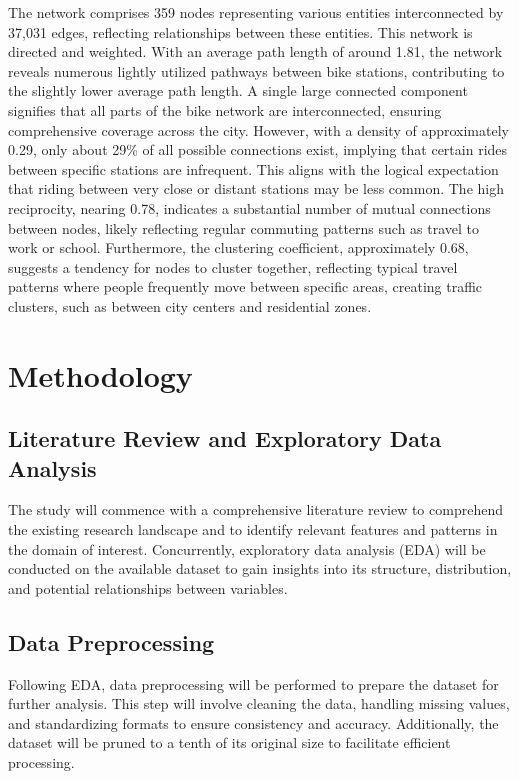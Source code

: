 \documentclass[conference]{IEEEtran}
\begin{document}
The network comprises 359 nodes representing various entities interconnected by 37,031 edges, reflecting relationships between these entities. This network is directed and weighted. With an average path length of around 1.81, the network reveals numerous lightly utilized pathways between bike stations, contributing to the slightly lower average path length. A single large connected component signifies that all parts of the bike network are interconnected, ensuring comprehensive coverage across the city. However, with a density of approximately 0.29, only about 29\% of all possible connections exist, implying that certain rides between specific stations are infrequent. This aligns with the logical expectation that riding between very close or distant stations may be less common. The high reciprocity, nearing 0.78, indicates a substantial number of mutual connections between nodes, likely reflecting regular commuting patterns such as travel to work or school. Furthermore, the clustering coefficient, approximately 0.68, suggests a tendency for nodes to cluster together, reflecting typical travel patterns where people frequently move between specific areas, creating traffic clusters, such as between city centers and residential zones.

\section{Methodology}

\subsection{Literature Review and Exploratory Data Analysis}
The study will commence with a comprehensive literature review to comprehend the existing research landscape and to identify relevant features and patterns in the domain of interest. Concurrently, exploratory data analysis (EDA) will be conducted on the available dataset to gain insights into its structure, distribution, and potential relationships between variables.

\subsection{Data Preprocessing}
Following EDA, data preprocessing will be performed to prepare the dataset for further analysis. This step will involve cleaning the data, handling missing values, and standardizing formats to ensure consistency and accuracy. Additionally, the dataset will be pruned to a tenth of its original size to facilitate efficient processing.
\end{document}

